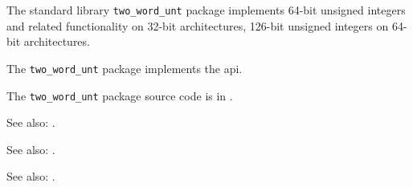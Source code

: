 
The standard library {\tt two\_word\_unt} package implements 64-bit unsigned integers and related 
functionality on 32-bit architectures, 126-bit unsigned integers on 64-bit architectures.

The {\tt two\_word\_unt} package implements the  api.

The {\tt two\_word\_unt} package source code is in .

See also: .

See also: .

See also: .
